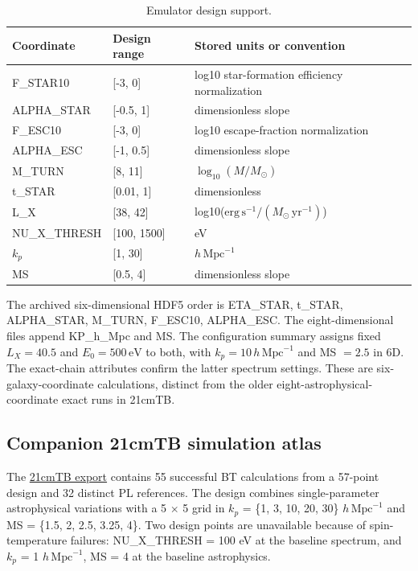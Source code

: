 \begin{table}[t]
\caption{Emulator design support.}
\label{tab:parameters}
\centering\small
\begin{tabular}{p{}p{}p{}}
\toprule
Coordinate & Design range & Stored units or convention \\
\midrule
F\_STAR10 & {[}-3, 0{]} & log10 star-formation efficiency normalization \\
ALPHA\_STAR & {[}-0.5, 1{]} & dimensionless slope \\
F\_ESC10 & {[}-3, 0{]} & log10 escape-fraction normalization \\
ALPHA\_ESC & {[}-1, 0.5{]} & dimensionless slope \\
M\_TURN & {[}8, 11{]} & $\log_{10}(M/M_\odot)$ \\
t\_STAR & {[}0.01, 1{]} & dimensionless \\
L\_X & {[}38, 42{]} & log10($\mathrm{erg\,s^{-1}}/(M_\odot\,\mathrm{yr^{-1}})$) \\
NU\_X\_THRESH & {[}100, 1500{]} & eV \\
\ensuremath{k_p} & {[}1, 30{]} & $h\,\mathrm{Mpc}^{-1}$ \\
MS & {[}0.5, 4{]} & dimensionless slope \\
\bottomrule
\end{tabular}
\end{table}

The archived six-dimensional HDF5 order is ETA\_STAR, t\_STAR, ALPHA\_STAR, M\_TURN, F\_ESC10, ALPHA\_ESC. The eight-dimensional files append KP\_h\_Mpc and MS. The configuration summary assigns fixed $L_X=40.5$ and $E_0=500\,\mathrm{eV}$ to both, with $k_p=10\,h\,\mathrm{Mpc}^{-1}$ and MS $=2.5$ in 6D. The exact-chain attributes confirm the latter spectrum settings. These are six-galaxy-coordinate calculations, distinct from the older eight-astrophysical-coordinate exact runs in 21cmTB.

\subsection{Companion 21cmTB simulation atlas}\label{companion-21cmtb-simulation-atlas}

The \href{https://github.com/HainaHuang729/21cmTB}{21cmTB export} contains 55 successful BT calculations from a 57-point design and 32 distinct PL references. The design combines single-parameter astrophysical variations with a 5 \(\times\) 5 grid in \ensuremath{k_p} = \{1, 3, 10, 20, 30\} $h\,\mathrm{Mpc}^{-1}$ and MS = \{1.5, 2, 2.5, 3.25, 4\}. Two design points are unavailable because of spin-temperature failures: NU\_X\_THRESH = 100 eV at the baseline spectrum, and \ensuremath{k_p} = 1 $h\,\mathrm{Mpc}^{-1}$, MS = 4 at the baseline astrophysics.

